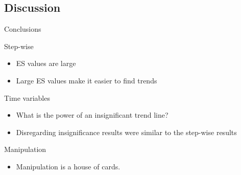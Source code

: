 	\subsection{Discussion}
		\begin{frame}{Conclusions}
			\begin{block}{Step-wise}
				\begin{itemize}
					\item ES values are large
					\item Large ES values make it easier to find trends
				\end{itemize}
			\end{block}
			\begin{block}{Time variables}
				\begin{itemize}
					\item What is the power of an insignificant trend line?
					\item Disregarding insignificance results were similar to the step-wise results
				\end{itemize}
			\end{block}
			\begin{block}{Manipulation}
				\begin{itemize}
					\item Manipulation is a house of cards.
				\end{itemize}
			\end{block}
		\end{frame}